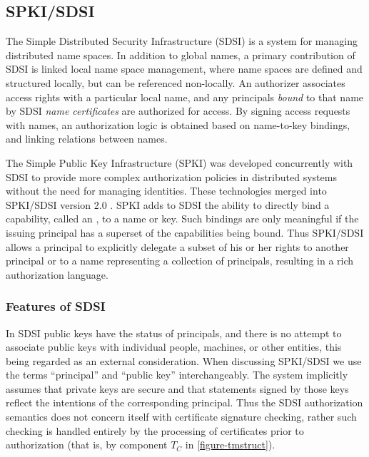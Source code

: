 
\subsection{SPKI/SDSI}

The Simple Distributed Security Infrastructure (SDSI)
\cite{Rivest:SDSI-10,Rivest:SDSI-11} is a system for managing
distributed name spaces.  In addition to global names, a primary
contribution of SDSI is linked local name space management, where
name spaces are defined and structured locally, but can be referenced
non-locally.  An authorizer associates access rights with a particular
local name, and any principals \emph{bound} to that name by SDSI
\emph{name certificates} are authorized for access.  By signing access
requests with names, an authorization logic is obtained based on
name-to-key bindings, and linking relations between names.

The Simple Public Key Infrastructure (SPKI) was developed concurrently
with SDSI to provide more complex authorization policies in
distributed systems without the need for managing identities. These
technologies merged into SPKI/SDSI version 2.0
\cite{RFC-2693}.  SPKI adds to SDSI the ability to
directly bind a capability, called an
, to a name or key. Such bindings are only
meaningful if the issuing principal has a superset of the capabilities
being bound. Thus SPKI/SDSI allows a principal to explicitly delegate
a subset of his or her rights to another principal or to a name
representing a collection of principals, resulting in a rich
authorization language.  

\subsubsection{Features of SDSI}

In SDSI public keys have the status of principals, and there is no
attempt to associate public keys with individual people, machines, or
other entities, this being regarded as an external consideration.  When
discussing SPKI/SDSI we use the terms ``principal'' and
``public key'' interchangeably.  The system implicitly assumes that
private keys are secure and that statements signed by those keys
reflect the intentions of the corresponding principal. Thus the SDSI
authorization semantics does not concern itself with certificate
signature checking, rather such checking is handled entirely by the
processing of certificates prior to authorization (that is, by
component $T_C$ in \autoref{figure-tmstruct}).

